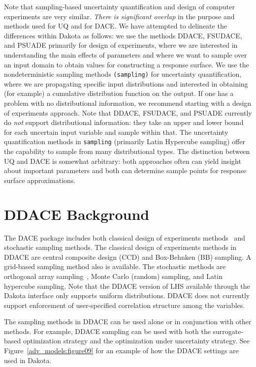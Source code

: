 Note that sampling-based uncertainty quantification and design of
computer experiments are very similar.  \emph{There is significant
overlap} in the purpose and methods used for UQ and for DACE.  We have
attempted to delineate the differences within Dakota as follows: we
use the methods DDACE, FSUDACE, and PSUADE primarily for design of
experiments, where we are interested in understanding the main effects
of parameters and where we want to sample over an input domain to
obtain values for constructing a response surface.  We use the
nondeterministic sampling methods \texttt{(sampling)} for
uncertainty quantification, where we are propagating specific input
distributions and interested in obtaining (for example) a cumulative
distribution function on the output.  If one has a problem with no
distributional information, we recommend starting with a design of
experiments approach.  Note that DDACE, FSUDACE, and PSUADE currently
do \emph{not} support distributional information: they take an upper
and lower bound for each uncertain input variable and sample within
that.  The uncertainty quantification methods in
\texttt{sampling} (primarily Latin Hypercube sampling) offer the
capability to sample from many distributional types.  The distinction
between UQ and DACE is somewhat arbitrary: both approaches often can
yield insight about important parameters and both can determine sample
points for response surface approximations.

\section{DDACE Background}\label{dace:ddace}

The DACE package includes both classical design of experiments
methods~\cite{TonXX} and stochastic sampling methods. The classical
design of experiments methods in DDACE are central composite design
(CCD) and Box-Behnken (BB) sampling. A grid-based sampling method also
is available. The stochastic methods are orthogonal array
sampling~\cite{Koe96}, Monte Carlo (random) sampling, and Latin
hypercube sampling.  Note that the DDACE version of LHS available through the
Dakota interface only supports uniform distributions.  DDACE does not
currently support enforcement of user-specified correlation structure
among the variables.

The sampling methods in DDACE can be used alone or in conjunction with
other methods. For example, DDACE sampling can be used with both the
surrogate-based optimization strategy and the optimization under
uncertainty strategy. See Figure~\ref{adv_models:figure09} for an
example of how the DDACE settings are used in Dakota.

